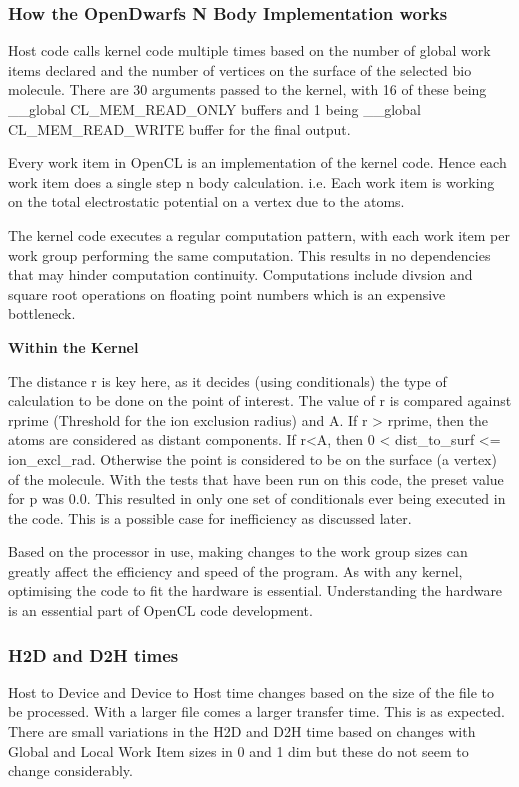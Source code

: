\subsubsection{How the OpenDwarfs N Body Implementation works}
\par{Host code calls kernel code multiple times based on the number of global work items declared and 
    the number of vertices on the surface of the selected bio molecule. There are 30 arguments passed 
    to the kernel, with 16 of these being \_\_global CL\_MEM\_READ\_ONLY buffers and 1 being \_\_global CL\_MEM\_READ\_WRITE 
    buffer for the final output.}

\par{Every work item in OpenCL is an implementation of the kernel code. 
    Hence each work item does a single step n body calculation. i.e. 
    Each work item is working on the total electrostatic potential on a vertex due to the atoms.}

\par{The kernel code executes a regular computation pattern, with each work item per work group 
    performing the same computation. This results in no dependencies that may hinder computation continuity. 
    Computations include divsion and square root operations on floating point numbers which is an expensive bottleneck.}


\par{\textbf{Within the Kernel}}
\par{The distance r is key here, as it decides (using conditionals) the type of calculation 
    to be done on the point of interest. The value of r is compared against rprime (Threshold 
    for the ion exclusion radius) and A. If r > rprime, then the atoms are considered as distant 
    components. If r<A, then 0 < dist\_to\_surf <= ion\_excl\_rad. Otherwise the point is considered 
    to be on the surface (a vertex) of the molecule. With the tests that have been run on this code, 
    the preset value for p was 0.0. This resulted in only one set of conditionals ever being executed 
    in the code. This is a possible case for inefficiency as discussed later.}

\par{Based on the processor in use, making changes to the work group sizes can greatly affect the
    efficiency and speed of the program. As with any kernel, optimising the code to fit the hardware 
    is essential. Understanding the hardware is an essential part of OpenCL code development.}

\subsubsection{H2D and D2H times}
\par{Host to Device and Device to Host time changes based on the size of the file to be processed. 
    With a larger file comes a larger transfer time. This is as expected. 
    There are small variations in the H2D and D2H time based on changes with 
    Global and Local Work Item sizes in 0 and 1 dim but these do not seem to change considerably.}
